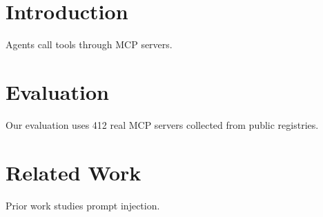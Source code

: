 \section{Introduction}
Agents call tools through MCP servers.
\section{Evaluation}
Our evaluation uses 412 real MCP servers collected from public registries.
\section{Related Work}
Prior work studies prompt injection.
